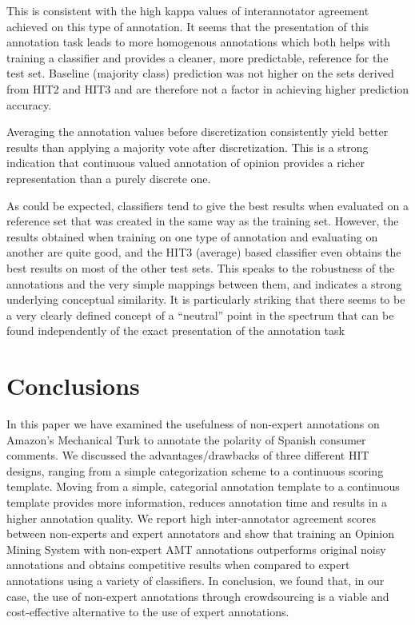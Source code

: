 \documentclass[11pt]{elsarticle}
\begin{document}
This is consistent with the high kappa values of interannotator agreement achieved on this type of annotation. It seems that the presentation of this annotation task leads to more homogenous annotations which both helps with training a classifier and provides a cleaner, more predictable, reference for the test set. Baseline (majority class) prediction was not higher on the sets derived from HIT2 and HIT3 and are therefore not a factor in achieving higher prediction accuracy.

Averaging the annotation values before discretization consistently yield better results than applying a majority vote after discretization. This is a strong indication that continuous valued annotation of opinion provides a richer representation than a purely discrete one.

As could be expected, classifiers tend to give the best results when evaluated on a reference set that was created in the same way as the training set. However, the results obtained when training on one type of annotation and evaluating on another are quite good, and the HIT3 (average) based classifier even obtains the best results on most of the other test sets. This speaks to the robustness of the annotations and the very simple mappings between them, and indicates a strong underlying conceptual similarity. It is particularly striking that there seems to be a very clearly defined concept of a ``neutral'' point in the spectrum that can be found independently of the exact presentation of the annotation task

\section{Conclusions}
\label{sect:conclusions}


In this paper we have examined the usefulness of non-expert annotations on Amazon's Mechanical Turk to annotate the polarity of Spanish consumer comments. We discussed the advantages/drawbacks of three different HIT designs, ranging from a simple categorization scheme to a continuous scoring template. Moving from a simple, categorial annotation template to a continuous template provides more information, reduces annotation time and results in a higher annotation quality. We report high inter-annotator agreement scores between non-experts and expert annotators and show that training an Opinion Mining System with non-expert AMT annotations outperforms original noisy annotations and obtains competitive results when compared to expert annotations using a variety of classifiers. In conclusion, we found that, in our case, the use of non-expert annotations through crowdsourcing is a viable and cost-effective alternative to the use of expert annotations.
\end{document}
